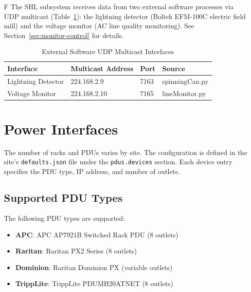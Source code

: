 \begin{newInVersion}{F}
The SHL subsystem receives data from two external software processes via UDP multicast (Table~\ref{tab:external-interfaces}): the lightning detector (Boltek EFM-100C electric field mill) and the voltage monitor (AC line quality monitoring). See Section~\ref{sec:monitor-control} for details.
\end{newInVersion}

\begin{table}[h]
    \centering
    \begin{tabular}{llll}
        \toprule
        \textbf{Interface} & \textbf{Multicast Address} & \textbf{Port} & \textbf{Source} \\
        \midrule
        Lightning Detector & 224.168.2.9 & 7163 & spinningCan.py \\
        Voltage Monitor & 224.168.2.10 & 7165 & lineMonitor.py \\
        \bottomrule
    \end{tabular}
    \caption{External Software UDP Multicast Interfaces}
    \label{tab:external-interfaces}
\end{table}

\section{Power Interfaces}

\begin{siteNote}
The number of racks and PDUs varies by site. The configuration is defined in the site's \texttt{defaults.json} file under the \texttt{pdus.devices} section. Each device entry specifies the PDU type, IP address, and number of outlets.
\end{siteNote}

\subsection{Supported PDU Types}

The following PDU types are supported:

\begin{itemize}
    \item \textbf{APC}: APC AP7921B Switched Rack PDU (8 outlets)
    \item \textbf{Raritan}: Raritan PX2 Series (8 outlets)
    \item \textbf{Dominion}: Raritan Dominion PX (variable outlets)
    \item \textbf{TrippLite}: TrippLite PDUMH20ATNET (8 outlets)
\end{itemize}


